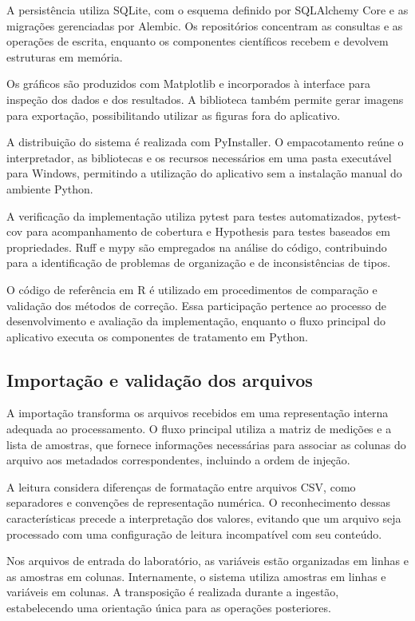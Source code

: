 A persistência utiliza SQLite, com o esquema definido por SQLAlchemy Core e as migrações gerenciadas por Alembic. Os repositórios concentram as consultas e as operações de escrita, enquanto os componentes científicos recebem e devolvem estruturas em memória.

Os gráficos são produzidos com Matplotlib e incorporados à interface para inspeção dos dados e dos resultados. A biblioteca também permite gerar imagens para exportação, possibilitando utilizar as figuras fora do aplicativo.

A distribuição do sistema é realizada com PyInstaller. O empacotamento reúne o interpretador, as bibliotecas e os recursos necessários em uma pasta executável para Windows, permitindo a utilização do aplicativo sem a instalação manual do ambiente Python.

A verificação da implementação utiliza pytest para testes automatizados, pytest-cov para acompanhamento de cobertura e Hypothesis para testes baseados em propriedades. Ruff e mypy são empregados na análise do código, contribuindo para a identificação de problemas de organização e de inconsistências de tipos.

O código de referência em R é utilizado em procedimentos de comparação e validação dos métodos de correção. Essa participação pertence ao processo de desenvolvimento e avaliação da implementação, enquanto o fluxo principal do aplicativo executa os componentes de tratamento em Python.

\subsection{Importação e validação dos arquivos}
\label{subsec:importacao-validacao}

A importação transforma os arquivos recebidos em uma representação interna adequada ao processamento. O fluxo principal utiliza a matriz de medições e a lista de amostras, que fornece informações necessárias para associar as colunas do arquivo aos metadados correspondentes, incluindo a ordem de injeção.

A leitura considera diferenças de formatação entre arquivos CSV, como separadores e convenções de representação numérica. O reconhecimento dessas características precede a interpretação dos valores, evitando que um arquivo seja processado com uma configuração de leitura incompatível com seu conteúdo.

Nos arquivos de entrada do laboratório, as variáveis estão organizadas em linhas e as amostras em colunas. Internamente, o sistema utiliza amostras em linhas e variáveis em colunas. A transposição é realizada durante a ingestão, estabelecendo uma orientação única para as operações posteriores.

